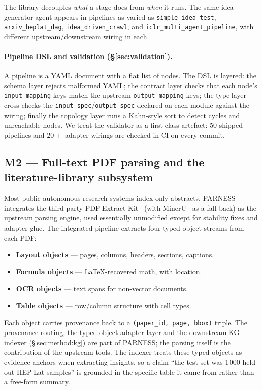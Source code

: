 \documentclass{article}
\newcommand{\parness}{\textsf{PARNESS}}
\newcommand{\code}[1]{\texttt{\small #1}}
\begin{document}
The library decouples \emph{what} a stage does from \emph{when} it
runs. The same idea-generator agent appears in pipelines as varied as
\code{simple\_idea\_test}, \code{arxiv\_heplat\_dag},
\code{idea\_driven\_crawl}, and \code{iclr\_multi\_agent\_pipeline}, with
different upstream/downstream wiring in each.

\paragraph{Pipeline DSL and validation (\S\ref{sec:validation}).}
A pipeline is a YAML document with a flat list of nodes. The DSL is
layered: the schema layer rejects malformed YAML; the contract layer
checks that each node's \code{input\_mapping} keys match the upstream
\code{output\_mapping} keys; the type layer cross-checks the
\code{input\_spec}/\code{output\_spec} declared on each module against
the wiring; finally the topology layer runs a Kahn-style sort to detect
cycles and unreachable nodes. We treat the validator as a first-class
artefact: $50$ shipped pipelines and $20+$ adapter wirings are checked
in CI on every commit.

\subsection{M2 --- Full-text PDF parsing and the literature-library subsystem}
\label{sec:method:pdf}
\label{sec:pdfflow}

Most public autonomous-research systems index only abstracts. \parness{}
integrates the third-party PDF-Extract-Kit~\cite{pdfextractkit} (with
MinerU~\cite{mineru} as a fall-back) as the upstream parsing engine,
used essentially unmodified except for stability fixes and adapter
glue. The integrated pipeline extracts four typed object streams from
each PDF:

\begin{itemize}[leftmargin=1.4em,itemsep=0.15em]
\item \textbf{Layout objects} --- pages, columns, headers, sections, captions.
\item \textbf{Formula objects} --- LaTeX-recovered math, with location.
\item \textbf{OCR objects} --- text spans for non-vector documents.
\item \textbf{Table objects} --- row/column structure with cell types.
\end{itemize}

Each object carries provenance back to a \code{(paper\_id, page, bbox)}
triple. The provenance routing, the typed-object adapter layer and the
downstream KG indexer (\S\ref{sec:method:kg}) are part of \parness{};
the parsing itself is the contribution of the upstream tools. The
indexer treats these typed objects as evidence anchors when extracting
insights, so a claim ``the test set was 1\,000 held-out HEP-Lat
samples'' is grounded in the specific table it came from rather than
a free-form summary.
\end{document}
